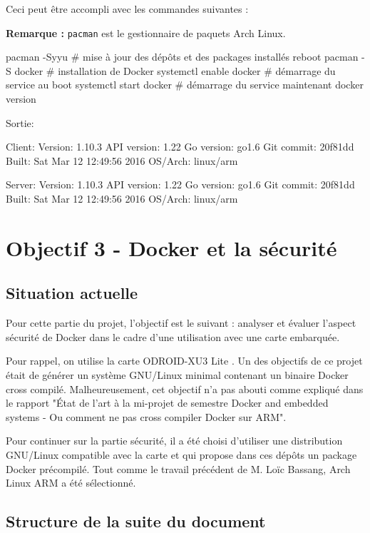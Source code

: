 \documentclass[11pt,a4paper,oneside]{report}
\newcommand{\code}[1]{\texttt{#1}}
\newcommand{\oldreportname}{État de l’art à la mi-projet de semestre Docker and embedded systems - Ou comment ne pas cross compiler Docker sur ARM}
\newcommand{\odroid}{ODROID-XU3 Lite }
\begin{document}
Ceci peut être accompli avec les commandes suivantes :

\textbf{Remarque :} \code{pacman} est le gestionnaire de paquets Arch Linux.

\begin{bashcode}
pacman -Syyu # mise à jour des dépôts et des packages installés
reboot
pacman -S docker # installation de Docker
systemctl enable docker # démarrage du service au boot
systemctl start docker # démarrage du service maintenant
docker version
\end{bashcode}

Sortie:

\begin{bashcode}
Client:
 Version:      1.10.3
 API version:  1.22
 Go version:   go1.6
 Git commit:   20f81dd
 Built:        Sat Mar 12 12:49:56 2016
 OS/Arch:      linux/arm

Server:
 Version:      1.10.3
 API version:  1.22
 Go version:   go1.6
 Git commit:   20f81dd
 Built:        Sat Mar 12 12:49:56 2016
 OS/Arch:      linux/arm
 \end{bashcode}


\chapter{Objectif 3 - Docker et la sécurité}

\section{Situation actuelle}
Pour cette partie du projet, l'objectif est le suivant : analyser et évaluer l'aspect sécurité de Docker dans le cadre d'une utilisation avec une carte embarquée.

Pour rappel, on utilise la carte \odroid. Un des objectifs de ce projet était de générer un système GNU/Linux minimal contenant un binaire Docker cross compilé. Malheureusement, cet objectif n'a pas abouti comme expliqué dans le rapport "\oldreportname".

Pour continuer sur la partie sécurité, il a été choisi d'utiliser une distribution GNU/Linux compatible avec la carte et qui propose dans ces dépôts un package Docker précompilé. Tout comme le travail précédent de M. Loïc Bassang, Arch Linux ARM a été sélectionné.

\section{Structure de la suite du document}
\end{document}
